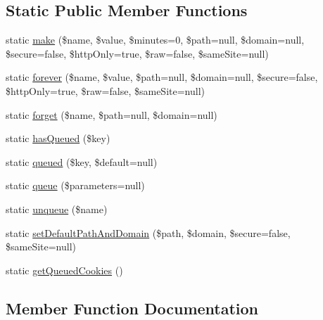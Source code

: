 \subsection*{Static Public Member Functions}
\begin{DoxyCompactItemize}
\item 
static \mbox{\hyperlink{class_illuminate_1_1_support_1_1_facades_1_1_cookie_afd4e81472bf1dcdc75900bef6a35718d}{make}} (\$name, \$value, \$minutes=0, \$path=null, \$domain=null, \$secure=false, \$http\+Only=true, \$raw=false, \$same\+Site=null)
\item 
static \mbox{\hyperlink{class_illuminate_1_1_support_1_1_facades_1_1_cookie_a8c53563a74ebc6627ff18f490dc188bd}{forever}} (\$name, \$value, \$path=null, \$domain=null, \$secure=false, \$http\+Only=true, \$raw=false, \$same\+Site=null)
\item 
static \mbox{\hyperlink{class_illuminate_1_1_support_1_1_facades_1_1_cookie_a3e7bf07e1e089ddc3588dc686b61207f}{forget}} (\$name, \$path=null, \$domain=null)
\item 
static \mbox{\hyperlink{class_illuminate_1_1_support_1_1_facades_1_1_cookie_a044ed9de6b432c56f78571b56b834f57}{has\+Queued}} (\$key)
\item 
static \mbox{\hyperlink{class_illuminate_1_1_support_1_1_facades_1_1_cookie_a49f771a37e7f2ada5d03c132bef166a3}{queued}} (\$key, \$default=null)
\item 
static \mbox{\hyperlink{class_illuminate_1_1_support_1_1_facades_1_1_cookie_ae325fe7d454cb2e9beb73b3968aeec50}{queue}} (\$parameters=null)
\item 
static \mbox{\hyperlink{class_illuminate_1_1_support_1_1_facades_1_1_cookie_a4a30cd4fe0e78ba8debf5ccd1b543923}{unqueue}} (\$name)
\item 
static \mbox{\hyperlink{class_illuminate_1_1_support_1_1_facades_1_1_cookie_ad50ea75cd9b57428c3945e55a42c154b}{set\+Default\+Path\+And\+Domain}} (\$path, \$domain, \$secure=false, \$same\+Site=null)
\item 
static \mbox{\hyperlink{class_illuminate_1_1_support_1_1_facades_1_1_cookie_ae7de7df09b6a05ed10f9d261d8dda31b}{get\+Queued\+Cookies}} ()
\end{DoxyCompactItemize}


\subsection{Member Function Documentation}
\mbox{\label{class_illuminate_1_1_support_1_1_facades_1_1_cookie_a8c53563a74ebc6627ff18f490dc188bd}} 
